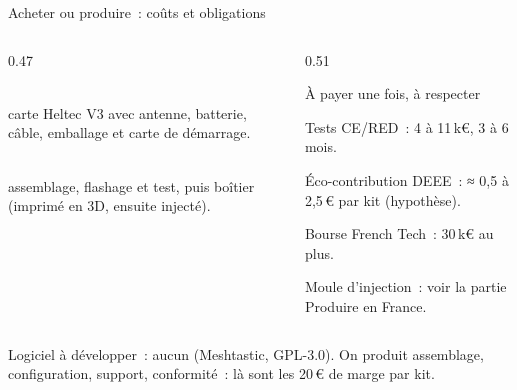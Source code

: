 \begin{frame}{Acheter ou produire~: coûts et obligations}
  \begin{columns}[T]
    \begin{column}{0.47\textwidth}
      \begin{carte}[height=1.75cm,valign=top]
        \raggedright{}\\[1pt]
        {\footnotesize carte Heltec V3 avec antenne, batterie, câble, emballage et carte de démarrage.}
      \end{carte}
      \vspace{0.1cm}
      \begin{carte}[height=1.75cm,valign=top]
        \raggedright{}\\[1pt]
        {\footnotesize assemblage, flashage et test, puis boîtier (imprimé en 3D, ensuite injecté).}
      \end{carte}
    \end{column}
    \begin{column}{0.51\textwidth}
      \begin{encadre}{À payer une fois, à respecter}
        \begin{puces}
          \item Tests CE/RED~: 4 à 11\,k€, 3 à 6 mois.
          \item Éco-contribution DEEE~: ≈ 0,5 à 2,5\,€ par kit (hypothèse).
          \item Bourse French Tech~: 30\,k€ au plus.
          \item Moule d'injection~: voir la partie Produire en France.
        \end{puces}
      \end{encadre}
    \end{column}
  \end{columns}
  \vspace{0.1cm}
  \begin{pointcle}\centering\footnotesize
    Logiciel à développer~: aucun (Meshtastic, GPL-3.0). On produit assemblage, configuration, support, conformité~: là sont les 20\,€ de marge par kit.
  \end{pointcle}
\end{frame}

